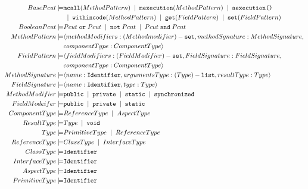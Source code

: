 \begin{center}
\begin{boxedminipage}{.8\columnwidth}
\begin{align*}
BasePcut \models&  \texttt{mcall}(MethodPattern) \; \mid \; \texttt{mexecution}(MethodPattern)\; \mid \; \texttt{aexecution()}\\
&\; \mid \;   \texttt{withincode}(MethodPattern)\; \mid \; \texttt{get}(FieldPattern)\; \mid \;  \texttt{set}(FieldPattern)\\
BooleanPcut  \models &  Pcut\; \texttt{or}\; Pcut \; \mid \; \texttt{not}\; Pcut\; \mid \; Pcut\; \texttt{and}\; Pcut\\
MethodPattern  \models & \langle methodModifiers:(Methodmodifier)-\texttt{set},methodSgnature:MethodSignature,\\
& componentType:ComponentType\rangle\\
FieldPattern   \models & \langle fieldModifiers:(FieldModifier)-\texttt{set},FieldSignature:FieldSignature,\\
&componentType : ComponentType \rangle \\
MethodSignature  \models & \langle name:\texttt{Identifier},argumentsType:(Type)-\texttt{list},resultType:Type \rangle\\
FieldSignature  \models & \langle name:\texttt{Identifier},type:Type \rangle\\
MethodModifier  \models & \texttt{public} \; \mid \; \texttt{private} \; \mid \;  \texttt{static} \; \mid \; \texttt{synchronized}\\
FieldModeifer  \models & \texttt{public} \; \mid \; \texttt{private} \; \mid \; \texttt{static} \\
ComponentType  \models & ReferenceType \; \mid \; AspectType\\
ResultType  \models & Type \; \mid \; \texttt{void}\\
Type  \models & PrimitiveType \; \mid \; ReferenceType\\
ReferenceType  \models & ClassType \; \mid \; InterfaceType\\
ClassType  \models & \texttt{Identifier}\\
InterfaceType  \models & \texttt{Identifier}\\
AspectType  \models & \texttt{Identifier}\\
PrimitiveType  \models & \texttt{Identifier}
\end{align*}
\end{boxedminipage}
\end{center}

